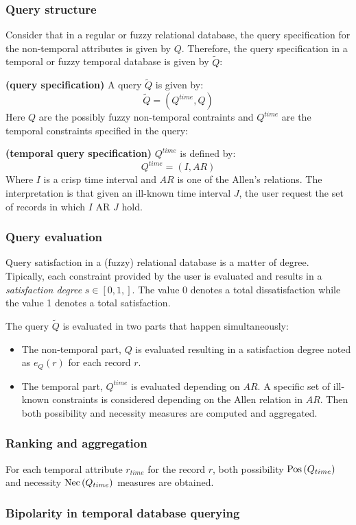 \subsubsection{Query structure}
Consider that in a regular or fuzzy relational database, the query specification for the non-temporal attributes is given by $Q$. Therefore, the query specification in a temporal or fuzzy temporal database is given by $\tilde{Q}$:

\begin{definition}
\textbf{(query specification)}
A query $\tilde{Q}$ is given by:
\begin{equation}
\tilde{Q} = \left( Q^{time}, Q \right)
\end{equation}
Here $Q$ are the possibly fuzzy non-temporal contraints and $Q^{time}$ are the temporal constraints specified in the query:
\end{definition}

\begin{definition}
\textbf{(temporal query specification)}
$Q^{time}$ is defined by:
\begin{equation}
Q^{time} = \left( I,AR \right)
\end{equation}
Where $I$ is a crisp time interval and $AR$ is one of the Allen's relations. The interpretation is that given an ill-known time interval $J$, the user request the set of records in which $I$ AR $J$ hold.
\end{definition}

\subsubsection{Query evaluation}
Query satisfaction in a (fuzzy) relational database is a matter of degree. Tipically, each constraint provided by the user is evaluated and results in a \emph{satisfaction degree} $s \in \left[ 0,1,\right]$. The value 0 denotes a total dissatisfaction while the value 1 denotes a total satisfaction.

The query $\tilde{Q}$ is evaluated in two parts that happen simultaneously:
\begin{itemize}
\item
The non-temporal part, $Q$ is evaluated resulting in a satisfaction degree noted as $e_Q(r)$ for each record $r$.
\item
The temporal part, $Q^{time}$ is evaluated depending on $AR$. A specific set of ill-known constraints is considered depending on the Allen relation in $AR$. Then both possibility and necessity measures are computed and aggregated.
\end{itemize}

\subsubsection{Ranking and aggregation}
For each temporal attribute $r_{time}$ for the record $r$, both possibility $\operatorname{Pos} \left( Q_{time}\right)$ and necessity $\operatorname{Nec} \left( Q_{time} \right)$ measures are obtained.


\subsubsection{Bipolarity in temporal database querying}